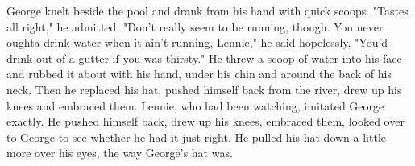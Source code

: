\documentclass[10pt,a4paper,table]{article}
\begin{document}
George knelt beside the pool and drank from his hand with quick scoops. "Tastes all right," he admitted. "Don't really seem to be running, though. You never oughta drink water when it ain't running, Lennie," he said hopelessly. "You'd drink out of a gutter if you was thirsty." He threw a scoop of water into his face and rubbed it about with his hand, under his chin and around the back of his neck. Then he replaced his hat, pushed himself back from the river, drew up his knees and embraced them. Lennie, who had been watching, imitated George exactly. He pushed himself back, drew up his knees, embraced them, looked over to George to see whether he had it just right. He pulled his hat down a little more over his eyes, the way George's hat was.
\end{document}
